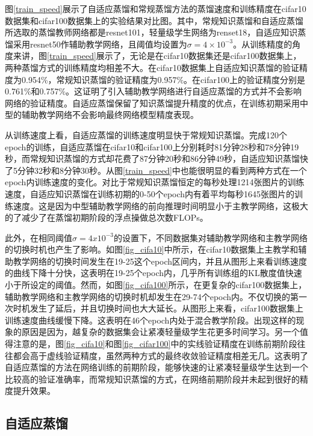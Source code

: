 图\ref{train_speed}展示了自适应蒸馏和常规蒸馏方法的蒸馏速度和训练精度在cifar10数据集和cifar100数据集上的实验结果对比图。其中，常规知识蒸馏和自适应蒸馏所选取的蒸馏教师网络都是resnet101，轻量级学生网络为renset18，自适应知识蒸馏采用resnet50作辅助教学网络，且阈值均设置为$\sigma = 4\times10^{-3}$。从训练精度的角度来讲，图\ref{train_speed}展示了，无论是在cifar10数据集还是cifar100数据集上，两种蒸馏方式的训练精度均相差不大。在cifar10数据集上自适应知识蒸馏的验证精度为0.954\%，常规知识蒸馏的验证精度为0.957\%。在cifar100上的验证精度分别是0.761\%和0.757\%。这证明了引入辅助教学网络进行自适应蒸馏的方式并不会影响网络的验证精度。自适应蒸馏保留了知识蒸馏提升精度的优点，在训练初期采用中型的辅助教学网络不会影响最终网络模型精度表现。

从训练速度上看，自适应蒸馏的训练速度明显快于常规知识蒸馏。完成120个epoch的训练，自适应蒸馏在cifar10和cifar100上分别耗时81分钟28秒和78分钟19秒，而常规知识蒸馏的方式却花费了87分钟20秒和86分钟49秒，自适应知识蒸馏快了5分钟32秒和8分钟30秒。从图\ref{train_speed}中也能很明显的看到两种方式在一个epoch内训练速度的变化。对比于常规知识蒸馏恒定的每秒处理1214张图片的训练速度，自适应知识蒸馏在训练初期的0-50个epoch内有着平均每秒1645张图片的训练速度。这是因为中型辅助教学网络的前向推理时间明显小于主教学网络，这极大的了减少了在蒸馏初期阶段的浮点操做总次数FLOPs。

此外，在相同阈值$\sigma = 4x10^{-3}$的设置下，不同数据集对辅助教学网络和主教学网络的切换时机也产生了影响。如图\ref{fig_cifa10}中所示，在cifar10数据集上主教学和辅助教学网络的切换时间发生在19-25这个epoch区间内，并且从图形上来看训练速度的曲线下降十分快，这表明在19-25个epoch内，几乎所有训练组的KL散度值快速小于所设定的阈值。然而，如图\ref{fig_cifa100}所示，在更复杂的cifar100数据集上，辅助教学网络和主教学网络的切换时机却发生在29-74个epoch内。不仅切换的第一次时机发生了延后，并且切换时间也大大延长。从图形上来看，cifar100数据集上训练速度曲线缓慢下降。这表明在46个epoch内处于混合教学阶段。出现这样的现象的原因是因为，越复杂的数据集会让紧凑轻量级学生花更多时间学习。另一个值得注意的是，图\ref{fig_cifa10}和图\ref{fig_cifar100}中的实线验证精度在训练前期阶段往往都会高于虚线验证精度，虽然两种方式的最终收敛验证精度相差无几。这表明了自适应蒸馏的方法在网络训练的前期阶段，能够快速的让紧凑轻量级学生达到一个比较高的验证准确率，而常规知识蒸馏的方式，在网络前期阶段并未起到很好的精度提升效果。

\subsection{自适应蒸馏}

